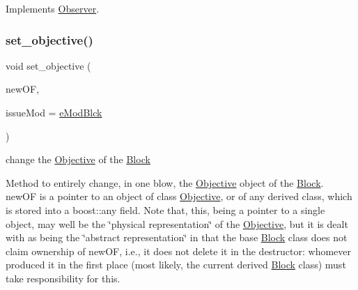 Implements \mbox{\hyperlink{class_s_m_spp__di__unipi__it_1_1_observer_a47f7642288d3e09ad9c792f86797840d}{Observer}}.

\mbox{\label{class_s_m_spp__di__unipi__it_1_1_block_a11eb0629a8dc10c24ec9c71e48aa7a26}} 
\subsubsection{\texorpdfstring{set\+\_\+objective()}{set\_objective()}}
{\footnotesize\ttfamily void set\+\_\+objective (\begin{DoxyParamCaption}\item[{ObjF \&}]{new\+OF,  }\item[{\mbox{\hyperlink{group___modification___t_y_p_e_s_ga544246d8c462e9a2d817c2c30797968f}{c\+\_\+\+Mod\+Param}}}]{issue\+Mod = {\ttfamily \mbox{\hyperlink{group___modification___t_y_p_e_s_gga48fddcdd03a03f49b7e389ca1ed938d4a21b14b26b1c0093a0905f6fc010bad29}{e\+Mod\+Blck}}} }\end{DoxyParamCaption})}



change the \mbox{\hyperlink{class_s_m_spp__di__unipi__it_1_1_objective}{Objective}} of the \mbox{\hyperlink{class_s_m_spp__di__unipi__it_1_1_block}{Block}} 

Method to entirely change, in one blow, the \mbox{\hyperlink{class_s_m_spp__di__unipi__it_1_1_objective}{Objective}} object of the \mbox{\hyperlink{class_s_m_spp__di__unipi__it_1_1_block}{Block}}. new\+OF is a pointer to an object of class \mbox{\hyperlink{class_s_m_spp__di__unipi__it_1_1_objective}{Objective}}, or of any derived class, which is stored into a boost\+::any field. Note that, this, being a pointer to a single object, may well be the \char`\"{}physical
representation\char`\"{} of the \mbox{\hyperlink{class_s_m_spp__di__unipi__it_1_1_objective}{Objective}}, but it is dealt with as being the \char`\"{}abstract representation\char`\"{} in that the base \mbox{\hyperlink{class_s_m_spp__di__unipi__it_1_1_block}{Block}} class does not claim ownership of new\+OF, i.\+e., it does not delete it in the destructor\+: whomever produced it in the first place (most likely, the current derived \mbox{\hyperlink{class_s_m_spp__di__unipi__it_1_1_block}{Block}} class) must take responsibility for this.

